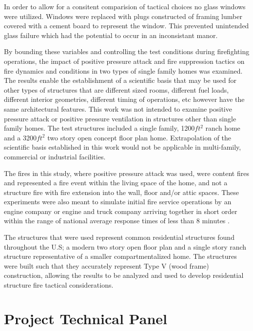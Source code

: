 \documentclass{article}
\begin{document}
In order to allow for a consitent comparision of tactical choices no glass windows were utilized. Windows were replaced with plugs constructed of framing lumber covered with a cement board to represent the window. This prevented unintended glass failure which had the potential to occur in an inconsistant manor.  

By bounding these variables and controlling the test conditions during firefighting operations, the impact of positive pressure attack and fire suppression tactics on fire dynamics and conditions in two types of single family homes was examined. The results enable the establishment of a scientific basis that may be used for other types of structures that are different sized rooms, different fuel loads, different interior geometries, different timing of operations, etc however have the same architectural features. This work was not intended to examine positive pressure attack or positive pressure ventilation in structures other than single family homes. The test structures included a single family, 1200$ft^2$ ranch home and a 3200$ft^2$ two story open concept floor plan home. Extrapolation of the scientific basis established in this work would not be applicable in multi-family, commercial or industrial facilities. 

The fires in this study, where positive pressure attack was used, were content fires and represented a fire event within the living space of the home, and not a structure fire with fire extension into the wall, floor and/or attic spaces. These experiments were also meant to simulate initial fire service operations by an engine company or engine and truck company arriving together in short order within the range of national average response times of less than 8 minutes \cite{USFA_Response_Times}.  

The structures that were used represent common residential structures found throughout the U.S; a modern two story open floor plan and a single story ranch structure representative of a smaller compartmentalized home. The structures were built such that they accurately represent Type V (wood frame) construction, allowing the results to be analyzed and used to develop residential structure fire tactical considerations. 

\clearpage

\section{Project Technical Panel}
\end{document}
